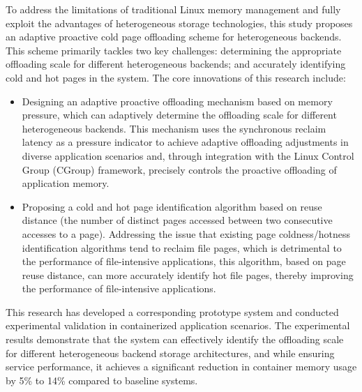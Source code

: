 \begin{englishabstract}
To address the limitations of traditional Linux memory management and fully exploit the advantages of heterogeneous storage technologies, this study proposes an adaptive proactive cold page offloading scheme for heterogeneous backends. This scheme primarily tackles two key challenges: determining the appropriate offloading scale for different heterogeneous backends; and accurately identifying cold and hot pages in the system. The core innovations of this research include:
\begin{itemize}
    \item Designing an adaptive proactive offloading mechanism based on memory pressure, which can adaptively determine the offloading scale for different heterogeneous backends. This mechanism uses the synchronous reclaim latency as a pressure indicator to achieve adaptive offloading adjustments in diverse application scenarios and, through integration with the Linux Control Group (CGroup) framework, precisely controls the proactive offloading of application memory.
    \item Proposing a cold and hot page identification algorithm based on reuse distance (the number of distinct pages accessed between two consecutive accesses to a page). Addressing the issue that existing page coldness/hotness identification algorithms tend to reclaim file pages, which is detrimental to the performance of file-intensive applications, this algorithm, based on page reuse distance, can more accurately identify hot file pages, thereby improving the performance of file-intensive applications.
\end{itemize}

    This research has developed a corresponding prototype system and conducted experimental validation in containerized application scenarios. The experimental results demonstrate that the system can effectively identify the offloading scale for different heterogeneous backend storage architectures, and while ensuring service performance, it achieves a significant reduction in container memory usage by 5\% to 14\% compared to baseline systems.



\end{englishabstract}


